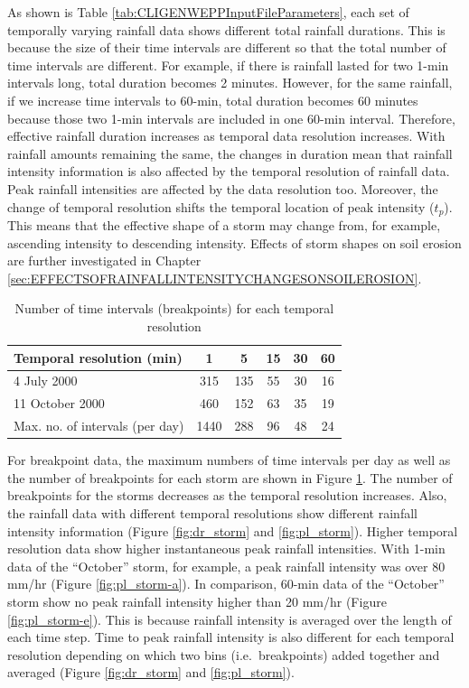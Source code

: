 As shown is Table \ref{tab:CLIGENWEPPInputFileParameters}, each set of
temporally varying rainfall data shows different total rainfall durations. This
is because the size of their time intervals are different so that the total
number of time intervals are different. For example, if there is rainfall
lasted for two 1-min intervals long, total duration becomes 2 minutes. However,
for the same rainfall, if we increase time intervals to 60-min, total duration
becomes 60 minutes because those two 1-min intervals are included in one 60-min
interval. Therefore, effective rainfall duration increases as temporal data
resolution increases. With rainfall amounts remaining the same, the changes in
duration mean that rainfall intensity information is also affected by the
temporal resolution of rainfall data.
Peak rainfall intensities are affected by the data resolution too. Moreover, the
change of temporal resolution shifts the temporal location of peak intensity
($t_p$). This means that the effective shape of a storm may change from, for
example, ascending intensity to descending intensity. Effects of storm shapes on
soil erosion are further investigated in Chapter
\ref{sec:EFFECTSOFRAINFALLINTENSITYCHANGESONSOILEROSION}.

\begin{table}[htbp]
  \centering
  \small
  \caption{Number of time intervals (breakpoints) for each temporal resolution}
  \label{tab:maxnooftimeintervalsperday}
    \begin{tabular}{lccccc}
    \toprule
    Temporal resolution (min) & 1 & 5 & 15 & 30 & 60 \\ \midrule
    4 July 2000 & 315 & 135 & 55 & 30 & 16 \\
    11 October 2000 & 460 & 152 & 63 & 35 & 19 \\
    Max. no. of intervals (per day) & 1440 & 288 & 96 & 48 & 24 \\
    \bottomrule
    \end{tabular}
\end{table}

For breakpoint data, the maximum numbers of time intervals per day as well as
the number of breakpoints for each storm are shown in Figure
\ref{tab:maxnooftimeintervalsperday}. The number of breakpoints for the storms
decreases as the temporal resolution increases. Also, the rainfall data with
different temporal resolutions show different rainfall intensity information
(Figure
\ref{fig:dr_storm} and \ref{fig:pl_storm}). Higher temporal resolution data show
higher instantaneous peak rainfall intensities. With 1-min data of the
``October'' storm, for example, a peak rainfall intensity was over 80 mm/hr
(Figure \ref{fig:pl_storm-a}). In comparison, 60-min data of the ``October''
storm show no peak rainfall intensity higher than 20 mm/hr (Figure
\ref{fig:pl_storm-e}). This is because rainfall intensity is averaged over the
length of each time step. Time to peak rainfall intensity is also different for
each temporal resolution depending on which two bins (i.e.\ breakpoints) added
together and averaged (Figure \ref{fig:dr_storm} and \ref{fig:pl_storm}).

